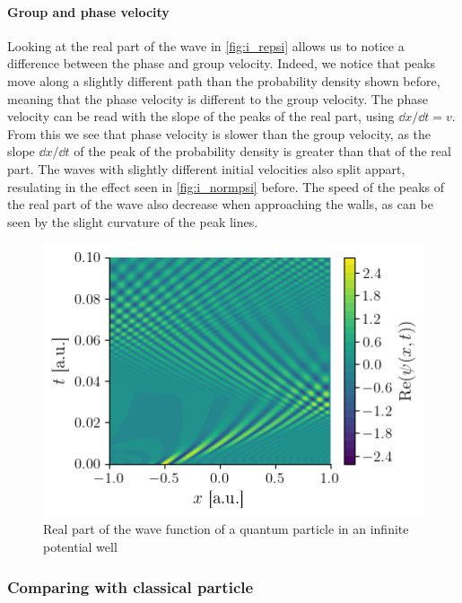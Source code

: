 \paragraph{Group and phase velocity} Looking at the real part of the wave in \autoref{fig:i_repsi} allows us to notice a difference between the phase and group velocity. Indeed, we notice that peaks move along a slightly different path than the probability density shown before, meaning that the phase velocity is different to the group velocity. The phase velocity can be read with the slope of the peaks of the real part, using \(\dd x / \dd t = v\). From this we see that phase velocity is slower than the group velocity, as the slope \(\dd x / \dd t\) of the peak of the probability density is greater than that of the real part. The waves with slightly different initial velocities also split appart, resulating in the effect seen in \autoref{fig:i_normpsi} before. The speed of the peaks of the real part of the wave also decrease when approaching the walls, as can be seen by the slight curvature of the peak lines.
\begin{figure}[h]
    \centering
    \includegraphics[width=0.6\linewidth]{figures/i_repsi.png}
    \caption{Real part of the wave function of a quantum particle in an infinite potential well}
    \label{fig:i_repsi}
\end{figure}

\subsubsection{Comparing with classical particle}

